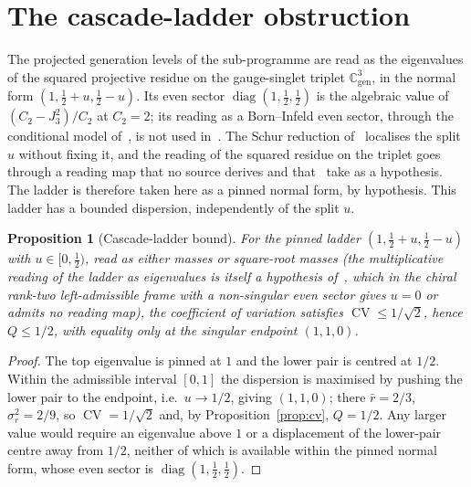 \documentclass[11pt]{article}
\newtheorem{proposition}{Proposition}
\theoremstyle{definition}
\theoremstyle{remark}
\newcommand{\CV}{\operatorname{CV}}
\newcommand{\Cgen}{\mathbb{C}^{3}_{\mathrm{gen}}}
\begin{document}
  \section{The cascade-ladder obstruction}
    \label{sec:ladder}

    The projected generation levels of the sub-programme are read as the eigenvalues of the squared projective
    residue on the gauge-singlet triplet $\Cgen$, in the normal form
    $(1, \tfrac12 + u, \tfrac12 - u)$.
    Its even sector $\operatorname{diag}(1, \tfrac12, \tfrac12)$ is the algebraic value of $(C_2-J_3^2)/C_2$ at
    $C_2=2$; its reading as a Born--Infeld even sector, through the conditional model of~\cite{Beau2026a34}, is not
    used in~\cite{Beau2026prs}.
    The Schur reduction of~\cite{Beau2026prs} localises the split $u$ without fixing it, and the reading of the squared
    residue on the triplet goes through a reading map that no source derives and that~\cite{Beau2026prs, Beau2026pyl} take as a hypothesis.
    The ladder is therefore taken here as a pinned normal form, by hypothesis.
    This ladder has a bounded dispersion, independently of the split $u$.

    \begin{proposition}[Cascade-ladder bound]
      \label{prop:ladder}
      For the pinned ladder $(1, \tfrac12 + u, \tfrac12 - u)$ with $u \in [0, \tfrac12)$, read as either masses or
      square-root masses (the multiplicative reading of the ladder as eigenvalues is itself a hypothesis of~\cite{Beau2026prs}, which in the chiral rank-two left-admissible frame with a non-singular even sector gives $u=0$ or admits no reading map), the coefficient of variation satisfies $\CV \le 1/\sqrt2$, hence $Q \le 1/2$, with
      equality only at the singular endpoint $(1,1,0)$.
    \end{proposition}

    \begin{proof}
      The top eigenvalue is pinned at $1$ and the lower pair is centred at $1/2$.
      Within the admissible interval $[0,1]$ the dispersion is maximised by pushing the lower pair to the endpoint,
      i.e.\ $u \to 1/2$, giving $(1,1,0)$; there $\bar r = 2/3$, $\sigma_r^2 = 2/9$, so $\CV = 1/\sqrt2$ and, by
      Proposition~\ref{prop:cv}, $Q = 1/2$.
      Any larger value would require an eigenvalue above $1$ or a displacement of the lower-pair centre away from
      $1/2$, neither of which is available within the pinned normal form, whose even sector is $\operatorname{diag}(1, \tfrac12, \tfrac12)$.
    \end{proof}
\end{document}
